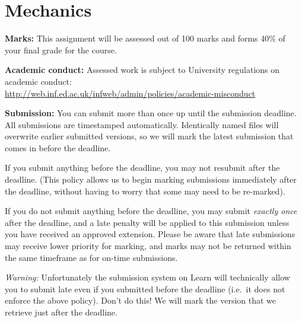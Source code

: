 \documentclass[11pt,]{article}
\def\markweight{40\xspace}
\begin{document}




\section{Mechanics}
\label{sec:mechanics}

\textbf{Marks:} 
This assignment will be assessed out of 100 marks and forms \markweight\% of your final grade for the course.

\textbf{Academic conduct:} 
Assessed work is subject to University
regulations on academic
conduct:\\ {\small \url{http://web.inf.ed.ac.uk/infweb/admin/policies/academic-misconduct}}

\textbf{Submission:} 
You can submit more than once up until the submission deadline. All
submissions are timestamped automatically. Identically named files
will overwrite earlier submitted versions, so we will mark the latest
submission that comes in before the deadline.

If you submit anything before the deadline, you may not resubmit
after the deadline. (This policy allows us to begin marking submissions
immediately after the deadline, without having to worry that some may
need to be re-marked).

If you do not submit anything before the deadline, you may submit {\em
exactly once} after the deadline, and a late penalty will be applied
to this submission unless you have received an approved extension.
Please be aware that late submissions may receive lower priority for
marking, and marks may not be returned within the same timeframe as
for on-time submissions.

{\em Warning:} Unfortunately the submission system on Learn will technically
allow you to submit late even if you submitted before the deadline
(i.e.\ it does not enforce the above policy). Don't do this! We will
mark the version that we retrieve just after the deadline.
\end{document}
